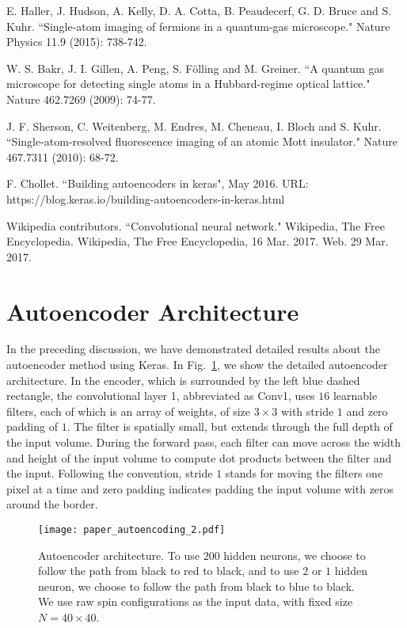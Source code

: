\documentclass[pra,letterpaper,10pt,twocolumn]{revtex4}
\begin{document}
\begin{thebibliography}{100}
E. Haller, J. Hudson, A. Kelly, D. A. Cotta, B. Peaudecerf, G. D. Bruce and S. Kuhr. ``Single-atom imaging of fermions in a quantum-gas microscope." Nature Physics 11.9 (2015): 738-742.

W. S. Bakr, J. I. Gillen, A. Peng, S. F{\"o}lling and M. Greiner. ``A quantum gas microscope for detecting single atoms in a Hubbard-regime optical lattice." Nature 462.7269 (2009): 74-77.

J. F. Sherson, C. Weitenberg, M. Endres, M. Cheneau, I. Bloch and S. Kuhr. ``Single-atom-resolved fluorescence imaging of an atomic Mott insulator." Nature 467.7311 (2010): 68-72.

F. Chollet. ``Building autoencoders in keras", May 2016. URL: https://blog.keras.io/building-autoencoders-in-keras.html

Wikipedia contributors. ``Convolutional neural network." Wikipedia, The Free Encyclopedia. Wikipedia, The Free Encyclopedia, 16 Mar. 2017. Web. 29 Mar. 2017.


\end{thebibliography}


\appendix*
\section{Autoencoder Architecture}

In the preceding discussion, we have demonstrated detailed results about
the autoencoder method using Keras\cite{Chollet}. In
Fig.~\ref{fig:autoencoding_2}, we show the detailed autoencoder
architecture. In the encoder, which is surrounded by the left blue
dashed rectangle, the convolutional layer 1, abbreviated as Conv1, uses
$16$ learnable filters, each of which is an array of weights, of size
$3\times 3$ with stride $1$ and zero padding of $1$.  The filter is
spatially small, but extends through the full depth of the input volume.
During the forward pass, each filter can move across the width and
height of the input volume to compute dot products between the filter
and the input.  Following the convention, stride $1$ stands for moving
the filters one pixel at a time and zero padding indicates padding the
input volume with zeros around the border. 

\begin{figure}[!h]
\texttt{[image: paper\_autoencoding\_2.pdf]}  
\caption{
Autoencoder architecture. To use $200$ hidden neurons, we choose to
follow the path from black to red to black, and to use $2$ or $1$ hidden
neuron, we choose to follow the path from black to blue to black. We use
raw spin configurations as the input data, with fixed size $N=40\times 40$.
\label{fig:autoencoding_2}
}
\end{figure}
\end{document}
